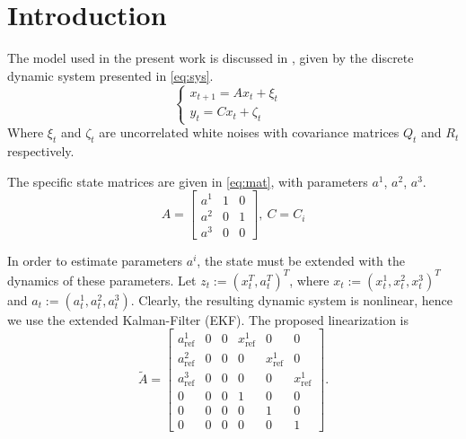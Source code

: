 \section{Introduction}\label{sec:intro}
The model used in the present work is discussed in \cite{wei2017parameter}, given by the discrete dynamic system presented in \cref{eq:sys}.
\begin{equation}\label{eq:sys}
  \begin{cases}
    x_{t+1}=A x_t+\xi_t&\\
    y_{t}=Cx_t + \zeta_t&
  \end{cases}
\end{equation}
Where $\xi_t$ and $\zeta_t$ are uncorrelated white noises with covariance matrices $Q_t$ and $R_t$ respectively.

The specific state matrices are given in \cref{eq:mat}, with parameters $a^1$, $a^2$, $a^3$.
\begin{equation}\label{eq:mat}
A=\begin{bmatrix}
{a^{1}} & {1} & {0} \\
{a^{2}} & {0} & {1} \\
{a^{3}} & {0} & {0}
\end{bmatrix}, \ C=C_i
\end{equation}

In order to estimate parameters $a^i$, the state must be extended with the dynamics of these parameters. Let $z_t:=(x_t^T, a_t^T)^T$, where $x_t:=(x_t^1,x_t^2,x_t^3)^T$ and $a_t:=(a_t^1,a_t^2,a_t^3)$. Clearly, the resulting dynamic system is nonlinear, hence we use the extended Kalman-Filter (EKF). The proposed linearization is
\begin{equation}\label{eq:linmat}
  \tilde{A}=\begin{bmatrix}
    a^1_{\text{ref}} & 0 & 0 & x^1_{\text{ref}} & 0 & 0\\
    a^2_{\text{ref}} & 0 & 0 & 0 & x^1_{\text{ref}} & 0\\
    a^3_{\text{ref}} & 0 & 0 & 0 & 0 & x^1_{\text{ref}}\\
    0 & 0 & 0 & 1 & 0 & 0\\
    0 & 0 & 0 & 0 & 1 & 0\\
    0 & 0 & 0 & 0 & 0 & 1
  \end{bmatrix}.
\end{equation}
